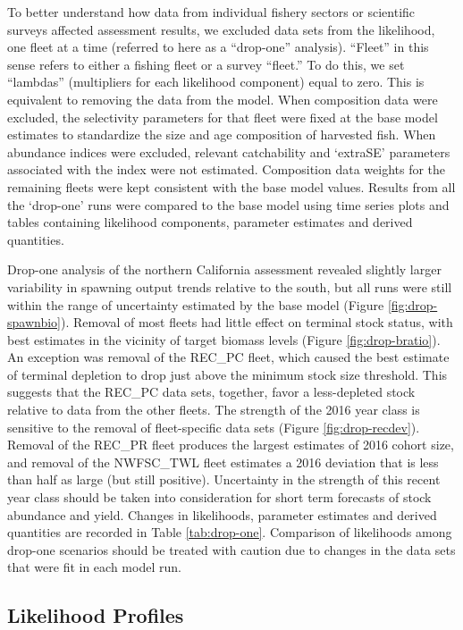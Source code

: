 \documentclass[
  english,
  a4paper,
]{article}
\begin{document}
To better understand how data from individual fishery sectors or scientific surveys affected assessment results, we excluded data sets from the likelihood, one fleet at a time (referred to here as a ``drop-one'' analysis). ``Fleet'' in this sense refers to either a fishing fleet or a survey ``fleet.'' To do this, we set ``lambdas'' (multipliers for each likelihood component) equal to zero. This is equivalent to removing the data from the model. When composition data were excluded, the selectivity parameters for that fleet were fixed at the base model estimates to standardize the size and age composition of harvested fish. When abundance indices were excluded, relevant catchability and `extraSE' parameters associated with the index were not estimated. Composition data weights for the remaining fleets were kept consistent with the base model values. Results from all the `drop-one' runs were compared to the base model using time series plots and tables containing likelihood components, parameter estimates and derived quantities.

Drop-one analysis of the northern California assessment revealed slightly larger variability in spawning output trends relative to the south, but all runs were still within the range of uncertainty estimated by the base model (Figure \ref{fig:drop-spawnbio}). Removal of most fleets had little effect on terminal stock status, with best estimates in the vicinity of target biomass levels (Figure \ref{fig:drop-bratio}). An exception was removal of the REC\_PC fleet, which caused the best estimate of terminal depletion to drop just above the minimum stock size threshold. This suggests that the REC\_PC data sets, together, favor a less-depleted stock relative to data from the other fleets. The strength of the 2016 year class is sensitive to the removal of fleet-specific data sets (Figure \ref{fig:drop-recdev}). Removal of the REC\_PR fleet produces the largest estimates of 2016 cohort size, and removal of the NWFSC\_TWL fleet estimates a 2016 deviation that is less than half as large (but still positive). Uncertainty in the strength of this recent year class should be taken into consideration for short term forecasts of stock abundance and yield. Changes in likelihoods, parameter estimates and derived quantities are recorded in Table \ref{tab:drop-one}. Comparison of likelihoods among drop-one scenarios should be treated with caution due to changes in the data sets that were fit in each model run.

\hypertarget{likelihood-profiles}{%
\subsection{Likelihood Profiles}\label{likelihood-profiles}}
\end{document}
